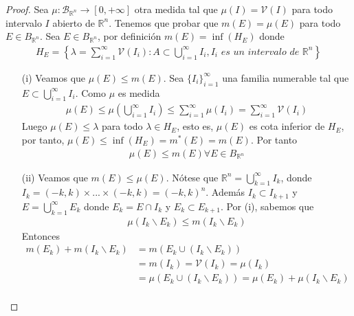 \begin{proof}
    Sea $\mu: \mathcal{B}_{\mathbb{R}^n} \longrightarrow [0,+\infty]$ otra medida tal que $\mu(I) = \mathcal{V}(I)$ para todo intervalo $I$ abierto de $\mathbb{R}^n$. Tenemos que probar que $m(E) = \mu(E)$ para todo $E \in B_{\mathbb{R}^n}$. Sea $E \in B_{\mathbb{R}^n}$, por definición $m(E) = \inf(H_E)$ donde
    \begin{align*}
        H_E = \left\{ \lambda = \sum_{i=1}^{\infty}{\mathcal{V}(I_i)} : A \subset \bigcup_{i=1}^{\infty}{I_i}, I_i \textit{ es un intervalo de } \mathbb{R}^n \right\}
    \end{align*}
    \begin{enumerate}
        \item[(i)] Veamos que $\mu(E) \leq m(E)$. Sea $\{I_i\}_{i=1}^{\infty}$ una familia numerable tal que $E \subset \bigcup_{i=1}^{\infty}{I_i}$. Como $\mu$ es medida
              \begin{align*}
                  \mu(E) \leq \mu \left( \bigcup_{i=1}^{\infty}{I_i}\right) \leq \sum_{i=1}^{\infty}{\mu(I_i)} = \sum_{i=1}^{\infty}{\mathcal{V}(I_i)}
              \end{align*}
              Luego $\mu(E) \leq \lambda$ para todo $\lambda \in H_E$, esto es, $\mu(E)$ es cota inferior de $H_E$, por tanto, $\mu(E) \leq \inf(H_E) = m^*(E) = m(E)$. Por tanto
              \begin{align*}
                  \mu(E) \leq m(E) \forall E \in B_{\mathbb{R}^n}
              \end{align*}
        \item[(ii)] Veamos que $m(E) \leq \mu(E)$. Nótese que $\mathbb{R}^n = \bigcup_{k=1}^{\infty}{I_k}$, donde $I_k = (-k,k) \times ... \times (-k,k) = (-k,k)^n$. Además $I_k \subset I_{k+1}$ y $E = \bigcup_{k=1}^{\infty}{E_k}$ donde $E_k = E \cap I_k$ y $E_k \subset E_{k+1}$. Por (i), sabemos que
              \begin{align*}
                  \mu(I_k \backslash E_k) \leq m(I_k \backslash E_k)
              \end{align*}
              Entonces
              \begin{align*}
                  m(E_k) + m(I_k \backslash E_k) & = m( E_k \cup (I_k \backslash E_k))                                         \\
                                                 & = m(I_k) = \mathcal{V}(I_k) = \mu(I_k)                                      \\
                                                 & = \mu ( E_k \cup (I_k \backslash E_k)) = \mu(E_k) + \mu(I_k \backslash E_k) \\

\end{align*}
\end{enumerate}
\end{proof}
